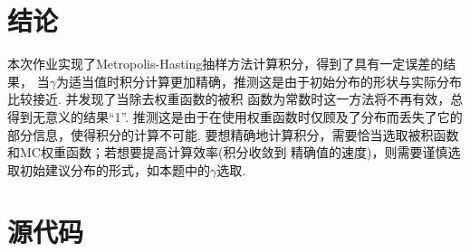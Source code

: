 \documentclass[12pt,a4paper,utf8]{ctexart}
\begin{document}
\section{结论}

本次作业实现了Metropolis-Hasting抽样方法计算积分，得到了具有一定误差的结果，
当$\gamma$为适当值时积分计算更加精确，推测这是由于初始分布的形状与实际分布比较接近.
并发现了当除去权重函数的被积
函数为常数时这一方法将不再有效，总得到无意义的结果“1”.
推测这是由于在使用权重函数时仅顾及了分布而丢失了它的部分信息，使得积分的计算不可能.
要想精确地计算积分，需要恰当选取被积函数和MC权重函数；若想要提高计算效率(积分收敛到
精确值的速度)，则需要谨慎选取初始建议分布的形式，如本题中的$\gamma$选取.

\section{源代码}
\end{document}
